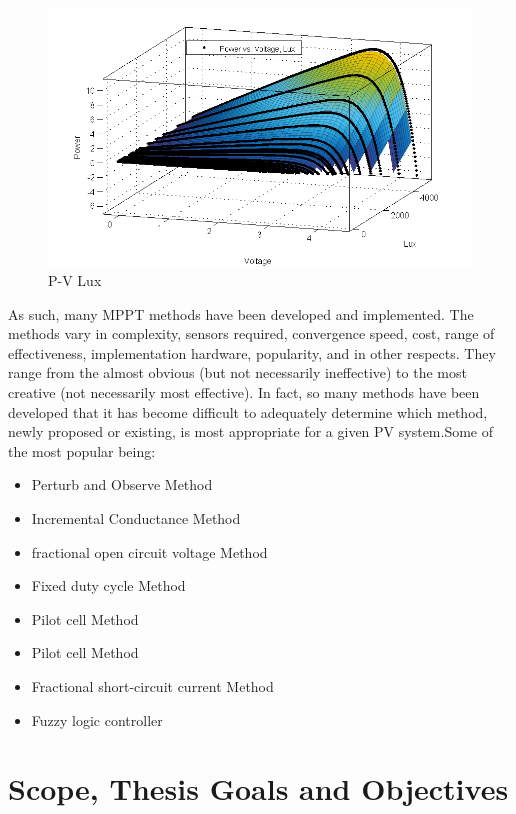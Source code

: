   \begin{figure}[H]
  \begin{center}
  \includegraphics[width=\textwidth]{images/PV_LUX}
  \caption{ P-V Lux}
  \label{fig:PVgraph}
  \end{center}
  \end{figure}

As such, many \ac{MPPT} methods have been developed and implemented. The methods vary in complexity, sensors required, convergence speed, cost, range of effectiveness, implementation hardware, popularity, and in other respects. They range from the almost obvious (but not necessarily ineffective) to the most creative (not necessarily most effective). In fact, so many methods have been developed that it has become difficult to adequately determine which method, newly proposed or existing, is most appropriate for a given PV system.Some of the most popular being: \\

  
\begin{itemize}
 \item Perturb and Observe Method
 \item Incremental Conductance Method
 \item fractional open circuit voltage Method
 \item Fixed duty cycle Method
 \item Pilot cell Method
 \item Pilot cell Method
 \item Fractional short-circuit current Method
 \item Fuzzy logic controller
\end {itemize}
 
 
 
\section{Scope, Thesis Goals and Objectives}

